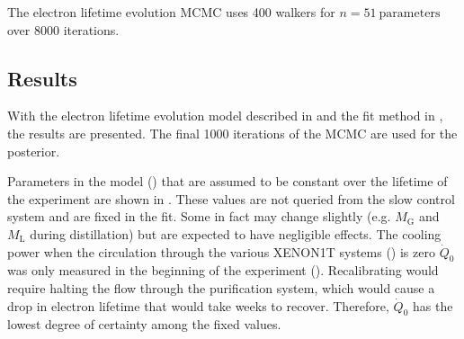 The electron lifetime evolution MCMC uses 400 walkers for $n = 51\ \mathrm{parameters}$ over 8000 iterations.



\subsection{Results}
\label{subsec:elifetime_fit_results}
With the electron lifetime evolution model described in  and the fit method in
, the results are presented.  The final 1000 iterations of the MCMC are used for the posterior.

Parameters in the model () that are assumed to be constant over the lifetime of the experiment are shown in
.  These values are not queried from the slow control system and are fixed in the
fit.  Some in fact may change slightly (e.g. $M_{\mathrm{G}}$ and $M_{\mathrm{L}}$ during distillation) but are expected to have negligible
effects.  The cooling power when the circulation through the various XENON1T systems () is zero
$\dot{Q}_0$ was only measured in the beginning of the experiment ().  Recalibrating
would require halting the flow through the purification system, which would cause a drop in electron lifetime that would take weeks to
recover.  Therefore, $\dot{Q}_0$ has the lowest degree of certainty among the fixed values.

\begin{table}
\centering
{}
\caption{Parameters in the electron lifetime evolution model that are fixed.}
\label{tab:elifetime_fit_results_posteriors_fixed}
\end{table}

